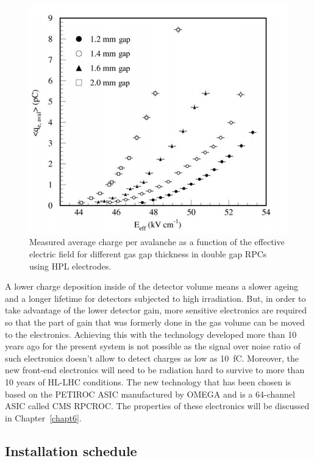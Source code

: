 	\begin{figure}[H]
		\centering
		\includegraphics[width=0.8\plotwidth]{fig/chapt3/charge-vs-gap.png}
		\caption{\label{fig:charge-gap} Measured average charge per avalanche as a function of the effective electric field for different gas gap thickness in double gap RPCs using HPL electrodes.}
	\end{figure}
	
	A lower charge deposition inside of the detector volume means a slower ageing and a longer lifetime for detectors subjected to high irradiation. But, in order to take advantage of the lower detector gain, more sensitive electronics are required so that the part of gain that was formerly done in the gas volume can be moved to the electronics. Achieving this with the technology developed more than 10 years ago for the present system is not possible as the signal over noise ratio of such electronics doesn't allow to detect charges as low as \SI{10}{fC}. Moreover, the new front-end electronics will need to be radiation hard to survive to more than 10 years of HL-LHC conditions. The new technology that has been chosen is based on the PETIROC ASIC manufactured by OMEGA and is a 64-channel ASIC called CMS RPCROC. The properties of these electronics will be discussed in Chapter~\ref{chapt6}.
	
	\subsection{Installation schedule}
	\label{chapt3:ssec:schedule}
	
